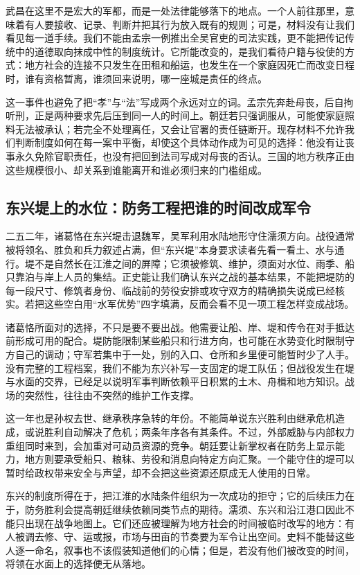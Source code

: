 武昌在这里不是宏大的军都，而是一处法律能够落下的地点。一个人前往那里，意味着有人要接收、记录、判断并把其行为放入既有的规则；可是，材料没有让我们看见每一道手续。我们不能由孟宗一例推出全吴官吏的司法实践，更不能把传记传统中的道德取向抹成中性的制度统计。它所能改变的，是我们看待户籍与役使的方式：地方社会的连接不只发生在田租和船运，也发生在一个家庭因死亡而改变日程时，谁有资格暂离，谁须回来说明，哪一座城是责任的终点。

这一事件也避免了把“孝”与“法”写成两个永远对立的词。孟宗先奔赴母丧，后自拘听刑，正是两种要求先后压到同一人的时间上。朝廷若只强调服从，可能使家庭照料无法被承认；若完全不处理离任，又会让官署的责任链断开。现存材料不允许我们判断制度如何在每一案中平衡，却使这个具体动作成为可见的选择：他没有让丧事永久免除官职责任，也没有把回到法司写成对母丧的否认。三国的地方秩序正由这些规模很小、却关系到谁能离开和谁必须归来的门槛组成。

\subsection{东兴堤上的水位：防务工程把谁的时间改成军令}
\label{reader:wu:dongxing}
二五二年，诸葛恪在东兴堤击退魏军，吴军利用水陆地形守住濡须方向。战役通常被将领名、胜负和兵力叙述占满，但“东兴堤”本身要求读者先看一看土、水与通行。堤不是自然长在江淮之间的屏障；它须被修筑、维护，须面对水位、雨季、船只靠泊与岸上人员的集结。正史能让我们确认东兴之战的基本结果，不能把堤防的每一段尺寸、修筑者身份、临战前的劳役安排或攻守双方的精确损失说成已经核实。若把这些空白用“水军优势”四字填满，反而会看不见一项工程怎样变成战场。

诸葛恪所面对的选择，不只是要不要出战。他需要让船、岸、堤和传令在对手抵达前形成可用的配合。堤防能限制某些船只和行进方向，也可能在水势变化时限制守方自己的调动；守军若集中于一处，别的入口、仓所和乡里便可能暂时少了人手。没有完整的工程档案，我们不能为东兴补写一支固定的堤工队伍；但战役发生在堤与水面的交界，已经足以说明军事判断依赖平日积累的土木、舟楫和地方知识。战场的突然性，往往由不突然的维护工作支撑。

这一年也是孙权去世、继承秩序急转的年份。不能简单说东兴胜利由继承危机造成，或说胜利自动解决了危机；两条年序各有其条件。不过，外部威胁与内部权力重组同时来到，会加重对可动员资源的竞争。朝廷要让新掌权者在防务上显示能力，地方则要承受船只、粮秣、劳役和消息向特定方向汇聚。一个能守住的堤可以暂时给政权带来安全与声望，却不会把这些资源还原成无人使用的日常。

东兴的制度所得在于，把江淮的水陆条件组织为一次成功的拒守；它的后续压力在于，防务胜利会提高朝廷继续依赖同类节点的期待。濡须、东兴和沿江港口因此不能只出现在战争地图上。它们还应被理解为地方社会的时间被临时改写的地方：有人被调去修、守、运或报，市场与田亩的节奏要为军令让出空间。史料不能替这些人逐一命名，叙事也不该假装知道他们的心情；但是，若没有他们被改变的时间，将领在水面上的选择便无从落地。


